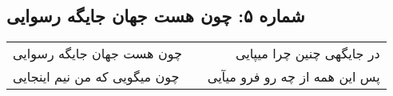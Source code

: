 \begin{center}
\section*{شماره ۵: چون هست جهان جایگه رسوایی}
\label{sec:005}
\begin{longtable}{l p{0.5cm} r}
چون هست جهان جایگه رسوایی
&&
در جایگهی چنین چرا میپایی
\\
چون میگویی که من نیم اینجایی
&&
پس این همه از چه رو فرو میآیی
\\
\end{longtable}
\end{center}
